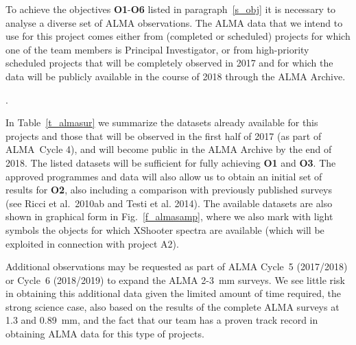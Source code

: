 \documentclass[10pt,fleqn,twoside]{article}
\begin{document}
To achieve the objectives {\bf O1}-{\bf O6} listed in paragraph~\ref{s_obj} it is necessary to analyse a diverse set of ALMA observations. The ALMA data that we intend to use for this project comes either from (completed or scheduled) projects for which one of the team members is Principal Investigator, or from high-priority scheduled projects that will be completely observed in 2017 and for which the data will be publicly available in the course of 2018 through the ALMA Archive.

\vspace{1em}{\Tcol\bf ALMA Data for objectives O1, O2, and O3}.

In Table~\ref{t_almasur} we summarize the datasets already available for this projects and those that will be observed in the first half of 2017 (as part of ALMA~Cycle 4), and will become public in the ALMA Archive by the end of 2018. The listed datasets will be sufficient for fully achieving {\bf O1} and {\bf O3}. The approved programmes and data will also allow us to obtain an initial set of results for {\bf O2}, also including a comparison with previously published surveys (see Ricci et al.~2010ab and Testi et al. 2014).
The available datasets are also shown in graphical form in Fig.~\ref{f_almasamp}, where we also mark with light symbols the objects for which XShooter spectra are available (which will be exploited in connection with project A2).

Additional observations may be requested as part of ALMA Cycle~5 (2017/2018) or Cycle~6 (2018/2019) to expand the ALMA 2-3~mm surveys. We see little risk in obtaining this additional data given the limited amount of time required, the strong science case, also based on the results of the complete ALMA surveys at 1.3 and 0.89~mm, and the fact that our team has a proven track record in obtaining ALMA data for this type of projects.
\end{document}
